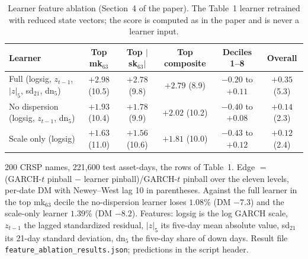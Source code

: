 \documentclass[11pt]{article}
\begin{document}
\begin{table}[htbp]
\centering
\begin{threeparttable}
\caption{Learner feature ablation (Section~4 of the paper). The Table~1 learner retrained with reduced state vectors; the score is computed as in the paper and is never a learner input.}
\label{tab:ablation}
\scriptsize\setlength{\tabcolsep}{3pt}
\begin{tabular}{lccccc}
\toprule
Learner & Top mk$_{63}$ & Top $|$sk$_{63}|$ & Top composite & Deciles 1--8 & Overall \\
\midrule
Full (logsig, $z_{t-1}$, $|z|_5$, sd$_{21}$, dn$_5$) & $+2.98$ (10.5) & $+2.78$ (9.8) & $+2.79$ (8.9) & $-0.20$ to $+0.11$ & $+0.35$ (5.3) \\
No dispersion (logsig, $z_{t-1}$, dn$_5$) & $+1.93$ (10.4) & $+1.78$ (9.9) & $+2.02$ (10.2) & $-0.40$ to $+0.08$ & $+0.14$ (2.3) \\
Scale only (logsig) & $+1.63$ (11.0) & $+1.56$ (10.6) & $+1.81$ (10.0) & $-0.43$ to $+0.12$ & $+0.12$ (2.4) \\
\bottomrule
\end{tabular}
\begin{tablenotes}\footnotesize
\item 200 CRSP names, 221,600 test asset-days, the rows of Table~1. Edge $=$ (GARCH-$t$ pinball $-$ learner pinball)/GARCH-$t$ pinball over the eleven levels, per-date DM with Newey--West lag 10 in parentheses. Against the full learner in the top mk$_{63}$ decile the no-dispersion learner loses $1.08\%$ (DM $-7.3$) and the scale-only learner $1.39\%$ (DM $-8.2$). Features: logsig is the log GARCH scale, $z_{t-1}$ the lagged standardized residual, $|z|_5$ its five-day mean absolute value, sd$_{21}$ its 21-day standard deviation, dn$_5$ the five-day share of down days. Result file \texttt{feature\_ablation\_results.json}; predictions in the script header.
\end{tablenotes}
\end{threeparttable}
\end{table}
\end{document}
